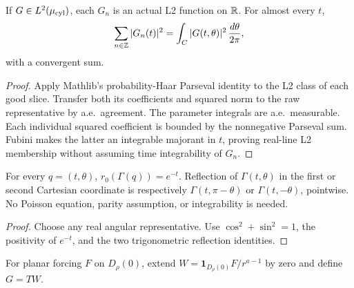 \begin{lemma}
\label{lem:cylinder-angular-analysis}
\leanok
If $G\in L^2(\mu_{\rm cyl})$, each $G_n$ is an actual L2 function on $\mathbb{R}$.
For almost every $t$,
\[
 \sum_{n\in\mathbb{Z}}|G_n(t)|^2=\int_C |G(t,\theta)|^2\,\frac{d\theta}{2\pi},
\]
with a convergent sum.
\end{lemma}

\begin{proof}
\leanok
Apply Mathlib's probability-Haar Parseval identity to the L2 class of each
good slice. Transfer both its coefficients and squared norm to the raw
representative by a.e.\ agreement. The parameter integrals are a.e.\ measurable.
Each individual squared coefficient is bounded by the nonnegative Parseval
sum. Fubini makes the latter an integrable majorant in $t$, proving real-line
L2 membership without assuming time integrability of $G_n$.
\end{proof}

\begin{lemma}
\label{lem:log-cylinder-pointwise-geometry}
\leanok
For every $q=(t,\theta)$, $r_0(\Gamma(q))=e^{-t}$.
Reflection of $\Gamma(t,\theta)$ in the first or second Cartesian coordinate
is respectively $\Gamma(t,\pi-\theta)$ or $\Gamma(t,-\theta)$, pointwise.
No Poisson equation, parity assumption, or integrability is needed.
\end{lemma}

\begin{proof}
\leanok
Choose any real angular representative. Use $\cos^2+\sin^2=1$, the positivity
of $e^{-t}$, and the two trigonometric reflection identities.
\end{proof}

\begin{definition}
\label{def:cylinder-physical-forcing}
\leanok
For planar forcing $F$ on $D_\rho(0)$, extend
$W=\mathbf1_{D_\rho(0)}F/r^{a-1}$ by zero and define $G=TW$.
\end{definition}

